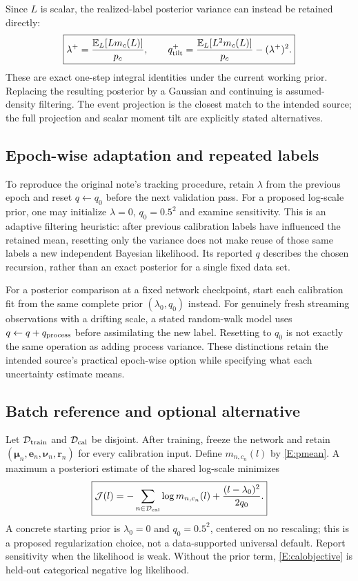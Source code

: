 \documentclass[letterpaper]{article}
\newcommand{\E}{\mathbb E}
\newcommand{\calD}{\mathcal D}
\begin{document}
Since $L$ is scalar, the realized-label posterior variance can instead be retained directly:
\begin{equation}
\boxed{\lambda^+=\frac{\E_L[Lm_c(L)]}{p_c},\qquad
q^+_{\rm tilt}=\frac{\E_L[L^2m_c(L)]}{p_c}-(\lambda^+)^2.}
\label{E:scaleadf}
\end{equation}
These are exact one-step integral identities under the current working prior. Replacing the resulting posterior by a Gaussian and continuing is assumed-density filtering. The event projection is the closest match to the intended source; the full projection and scalar moment tilt are explicitly stated alternatives.

\subsection{Epoch-wise adaptation and repeated labels}
To reproduce the original note's tracking procedure, retain $\lambda$ from the previous epoch and reset $q\leftarrow q_0$ before the next validation pass. For a proposed log-scale prior, one may initialize $\lambda=0$, $q_0=0.5^2$ and examine sensitivity. This is an adaptive filtering heuristic: after previous calibration labels have influenced the retained mean, resetting only the variance does not make reuse of those same labels a new independent Bayesian likelihood. Its reported $q$ describes the chosen recursion, rather than an exact posterior for a single fixed data set.

For a posterior comparison at a fixed network checkpoint, start each calibration fit from the same complete prior $(\lambda_0,q_0)$ instead. For genuinely fresh streaming observations with a drifting scale, a stated random-walk model uses $q\leftarrow q+q_{\rm process}$ before assimilating the new label. Resetting to $q_0$ is not exactly the same operation as adding process variance. These distinctions retain the intended source's practical epoch-wise option while specifying what each uncertainty estimate means.

\subsection{Batch reference and optional alternative}

Let $\calD_{\rm train}$ and $\calD_{\rm cal}$ be disjoint. After training, freeze the network and retain $(\bm\mu_n,\bm e_n,\bm\nu_n,\bm r_n)$ for every calibration input. Define $m_{n,c_n}(l)$ by \eqref{E:pmean}. A maximum a posteriori estimate of the shared log-scale minimizes
\begin{equation}
\boxed{
\mathcal J(l)=-\sum_{n\in\calD_{\rm cal}}\log m_{n,c_n}(l)
+\frac{(l-\lambda_0)^2}{2q_0}.
}\label{E:calobjective}
\end{equation}
A concrete starting prior is $\lambda_0=0$ and $q_0=0.5^2$, centered on no rescaling; this is a proposed regularization choice, not a data-supported universal default. Report sensitivity when the likelihood is weak. Without the prior term, \eqref{E:calobjective} is held-out categorical negative log likelihood.
\end{document}
